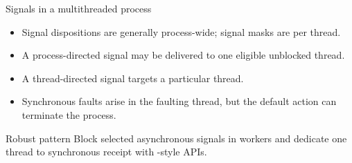\documentclass[aspectratio=169,11pt]{beamer}
\newcommand{\code}[1]{\texttt{\detokenize{#1}}}
\begin{document}
\begin{frame}{Signals in a multithreaded process}
  \begin{itemize}
    \item Signal dispositions are generally process-wide; signal masks are per thread.
    \item A process-directed signal may be delivered to one eligible unblocked thread.
    \item A thread-directed signal targets a particular thread.
    \item Synchronous faults arise in the faulting thread, but the default action can terminate the process.
  \end{itemize}
  \begin{block}{Robust pattern}
    Block selected asynchronous signals in workers and dedicate one thread to synchronous receipt with \code{sigwait()}-style APIs.
  \end{block}
\end{frame}
\end{document}
